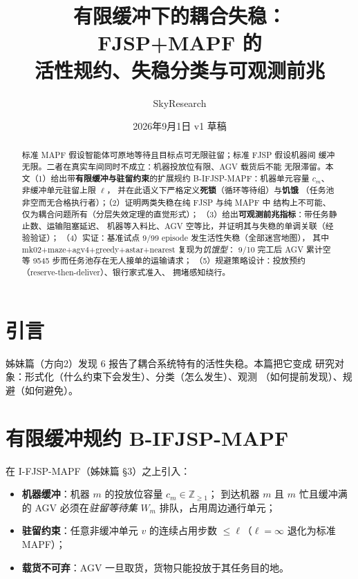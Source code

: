 \documentclass[UTF8,12pt,a4paper]{ctexart}
\title{有限缓冲下的耦合失稳：FJSP+MAPF 的\\活性规约、失稳分类与可观测前兆}
\author{SkyResearch}
\date{2026年9月1日 \quad v1 草稿}
\begin{document}
\maketitle

\begin{abstract}
标准 MAPF 假设智能体可原地等待且目标点可无限驻留；标准 FJSP 假设机器间
缓冲无限。二者在真实车间同时不成立：机器投放位有限、AGV 载货后不能
无限滞留。本文（1）给出带\textbf{有限缓冲与驻留约束}的扩展规约
B-IFJSP-MAPF：机器单元容量 $c_m$、非缓冲单元驻留上限 $\ell$，
并在此语义下严格定义\textbf{死锁}（循环等待组）与\textbf{饥饿}
（任务池非空而无合格执行者）；（2）证明两类失稳在纯 FJSP 与纯 MAPF 中
结构上不可能、仅为耦合问题所有（分层失效定理的直觉形式）；
（3）给出\textbf{可观测前兆指标}：带任务静止数、运输阻塞延迟、
机器等入料比、AGV 空等比，并证明其与失稳的单调关联（经验验证）；
（4）实证：基准试点 9/99 episode 发生活性失稳（全部迷宫地图），
其中 mk02+maze+agv4+greedy+astar+nearest 复现为\emph{饥饿型}：
9/10 完工后 AGV 累计空等 9545 步而任务池存在无人接单的运输请求；
（5）规避策略设计：投放预约（reserve-then-deliver）、银行家式准入、
拥堵感知绕行。
\end{abstract}

\section{引言}

姊妹篇（方向2）发现 6 报告了耦合系统特有的活性失稳。本篇把它变成
研究对象：形式化（什么约束下会发生）、分类（怎么发生）、观测
（如何提前发现）、规避（如何避免）。

\section{有限缓冲规约 B-IFJSP-MAPF}\label{sec:form}

在 I-FJSP-MAPF（姊妹篇 \S3）之上引入：

\begin{itemize}
  \item \textbf{机器缓冲}：机器 $m$ 的投放位容量 $c_m\in\mathbb{Z}_{\ge1}$；
    到达机器 $m$ 且 $m$ 忙且缓冲满的 AGV 必须在\emph{驻留等待集}
    $W_m$ 排队，占用周边通行单元；
  \item \textbf{驻留约束}：任意非缓冲单元 $v$ 的连续占用步数
    $\le \ell$（$\ell{=}\infty$ 退化为标准 MAPF）；
  \item \textbf{载货不可弃}：AGV 一旦取货，货物只能投放于其任务目的地。
\end{itemize}
\end{document}
